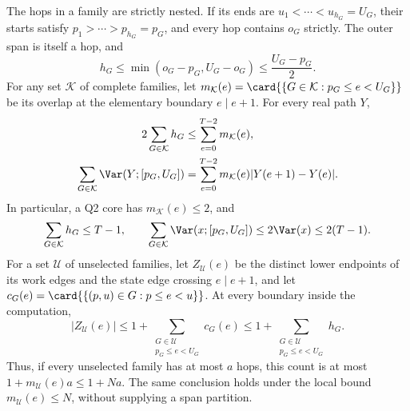 \begin{lemma}\label{lem:family-accounting}
The hops in a family are strictly nested. If its ends are
$u_1<\cdots<u_{h_G}=U_G$, their starts satisfy
$p_1>\cdots>p_{h_G}=p_G$, and every hop contains $o_G$ strictly.
The outer span is itself a hop, and
\[
 h_G\le\min(o_G-p_G,U_G-o_G)\le\frac{U_G-p_G}{2}.
\]
For any set $\mathcal K$ of complete families, let
$m_{\mathcal K}(e)=\card{\{G\in\mathcal K:p_G\le e<U_G\}}$
be its overlap at the elementary boundary $e\mid e+1$. For every real path $Y$,
\begin{align}\label{eq:family-overlap-profile}
 2\sum_{G\in\mathcal K}h_G
 &\le\sum_{e=0}^{T-2}m_{\mathcal K}(e),\notag\\
 \sum_{G\in\mathcal K}\Var(Y;[p_G,U_G])
 &=\sum_{e=0}^{T-2}m_{\mathcal K}(e)|Y(e+1)-Y(e)|.
\end{align}
In particular, a Q2 core has $m_{\mathcal K}(e)\le2$, and
\begin{equation}\label{eq:q2-mass-variation}
 \sum_{G\in\mathcal K}h_G\le T-1,
 \qquad
 \sum_{G\in\mathcal K}\Var(x;[p_G,U_G])
       \le2\Var(x)\le2(T-1).
\end{equation}
For a set $\mathcal U$ of unselected families, let $Z_{\mathcal U}(e)$
be the distinct lower endpoints of its work edges and the state edge
crossing $e\mid e+1$, and let
$c_G(e)=\card{\{(p,u)\in G:p\le e<u\}}$. At every boundary inside the
computation,
\begin{equation}\label{eq:local-boundary-bill}
 |Z_{\mathcal U}(e)|
 \le1+\sum_{\substack{G\in\mathcal U\\ p_G\le e<U_G}}c_G(e)
 \le1+\sum_{\substack{G\in\mathcal U\\ p_G\le e<U_G}}h_G.
\end{equation}
Thus, if every unselected family has at most $a$ hops, this count is at
most $1+m_{\mathcal U}(e)a\le1+Na$. The same conclusion holds under
the local bound $m_{\mathcal U}(e)\le N$, without supplying a span partition.
\end{lemma}

